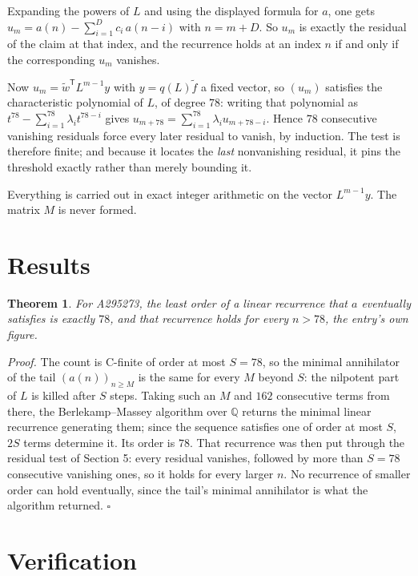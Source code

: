 \documentclass[11pt]{article}
\newtheorem{theorem}{Theorem}
\theoremstyle{definition}
\begin{document}
Expanding the powers of $L$ and using the displayed formula for $a$, one gets $u_m = a(n) - \sum_{i=1}^{D} c_i\,a(n-i)$ with $n = m + D$. So $u_m$ is exactly the residual of the claim at that index, and the recurrence holds at an index $n$ if and only if the corresponding $u_m$ vanishes.

Now $u_m = \tilde w^{\mathsf T} L^{m-1} y$ with $y = q(L)\tilde f$ a fixed vector, so $(u_m)$ satisfies the characteristic polynomial of $L$, of degree $78$: writing that polynomial as $t^{78} - \sum_{i=1}^{78} \lambda_i t^{78-i}$ gives $u_{m+78} = \sum_{i=1}^{78} \lambda_i u_{m+78-i}$. Hence $78$ consecutive vanishing residuals force every later residual to vanish, by induction. The test is therefore finite; and because it locates the {\itshape last} nonvanishing residual, it pins the threshold exactly rather than merely bounding it.

Everything is carried out in exact integer arithmetic on the vector $L^{m-1}y$. The matrix $M$ is never formed.

\section{Results}

\begin{theorem} For A295273, the least order of a linear recurrence that $a$ eventually satisfies is exactly $78$, and that recurrence holds for every $n > 78$, the entry's own figure.\end{theorem}

{\itshape Proof.} The count is C-finite of order at most $S = 78$, so the minimal annihilator of the tail $(a(n))_{n \ge M}$ is the same for every $M$ beyond $S$: the nilpotent part of $L$ is killed after $S$ steps. Taking such an $M$ and $162$ consecutive terms from there, the Berlekamp--Massey algorithm over $\mathbb{Q}$ returns the minimal linear recurrence generating them; since the sequence satisfies one of order at most $S$, $2S$ terms determine it. Its order is $78$. That recurrence was then put through the residual test of Section 5: every residual vanishes, followed by more than $S = 78$ consecutive vanishing ones, so it holds for every larger $n$. No recurrence of smaller order can hold eventually, since the tail's minimal annihilator is what the algorithm returned. $\square$

\section{Verification}
\end{document}
